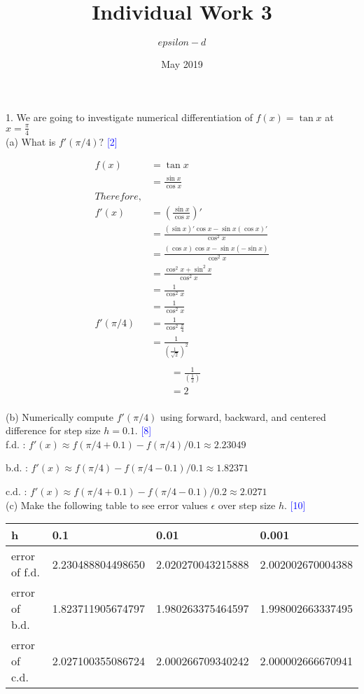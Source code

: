 \documentclass{article}
\title{Individual Work 3}
\author{$epsilon-d$}
\date{May 2019}
\begin{document}
\maketitle

\Large 1. We are going to investigate numerical differentiation of $f(x) = \tan x$  at  $x = \frac{\pi}{4}$\\

\large(a) What is $f'(\pi/4)?$ \textcolor{blue}{[2]}

\begin{align*}
f(x) &= \tan x\\
&= \frac{\sin x}{\cos x}\\
Therefore,\\
f'(x) &= (\frac{\sin x}{\cos x})' \\ 
&= \frac{(\sin x)'\cos x - \sin x(\cos x)'}{\cos^2 x}\\
&= \frac{(\cos x)\cos x - \sin x(-\sin x)}{\cos^2 x}\\
&= \frac{\cos^2 x + \sin^2 x}{\cos^2 x}\\
&= \frac{1}{\cos^2 x}\\
&= \frac{1}{\cos^2 x}\\
f'(\pi/4) &= \frac{1}{\cos^2 \frac{\pi}{4}}\\
&=\frac{1}{(\frac{1}{\sqrt{2}})^2}\\
\end{align*}
\begin{align*}
&=\frac{1}{(\frac{1}{2})}\\
&=2\\
\end{align*}

(b) Numerically compute $f'(\pi/4)$ using forward, backward, and centered difference for step size $h = 0.1$. \textcolor{blue}{[8]}\\

f.d. : $f'(x)\approx f(\pi/4+0.1)-f(\pi/4)/0.1\approx2.23049$\par
b.d. : $f'(x)\approx f(\pi/4)-f(\pi/4-0.1)/0.1\approx1.82371$\par
c.d. : $f'(x)\approx f(\pi/4+0.1)-f(\pi/4-0.1)/0.2\approx2.0271$\\

(c) Make the following table to see error values $\epsilon$ over step size $h$. \textcolor{blue}{[10]}\\

\begin{table}[h]
\begin{tabular}{l|lll}
h             & 0.1               & 0.01              & 0.001             \\ \hline
error of f.d. & 2.230488804498650 & 2.020270043215888 & 2.002002670004388 \\
error of b.d. & 1.823711905674797 & 1.980263375464597 & 1.998002663337495 \\
error of c.d. & 2.027100355086724 & 2.000266709340242 & 2.000002666670941
\end{tabular}
\end{table}
\end{document}
